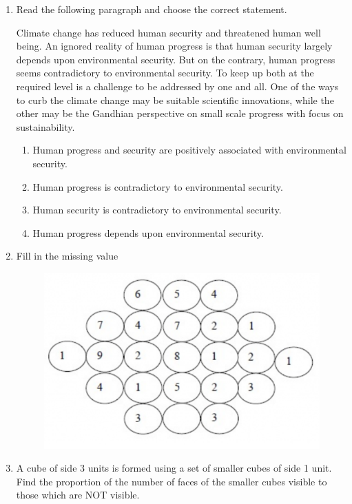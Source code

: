 \documentclass[a4paper, 11pt]{article}
\begin{document}
\begin{enumerate}
    \hfill{}

    \item Read the following paragraph and choose the correct statement.
    
    Climate change has reduced human security and threatened human well being. An ignored reality of human progress is that human security largely depends upon environmental security. But on the contrary, human progress seems contradictory to environmental security. To keep up both at the required level is a challenge to be addressed by one and all. One of the ways to curb the climate change may be suitable scientific innovations, while the other may be the Gandhian perspective on small scale progress with focus on sustainability.
    \begin{enumerate}
        \item Human progress and security are positively associated with environmental security.
        \item Human progress is contradictory to environmental security.
        \item Human security is contradictory to environmental security.
        \item Human progress depends upon environmental security.
    \end{enumerate}
    
    \hfill{}

    \item Fill in the missing value
    \begin{figure}[H]
        \centering
        \includegraphics[width=0.5\columnwidth]{figs/q8.png}
        \caption*{}
        \label{fig:q8}
    \end{figure}
    
    \underline{\hspace{2cm}}
    
    \hfill{}

    \item A cube of side 3 units is formed using a set of smaller cubes of side 1 unit. Find the proportion of the number of faces of the smaller cubes visible to those which are NOT visible.
    \begin{enumerate}
    \end{enumerate}
    

\end{enumerate}
\end{document}
